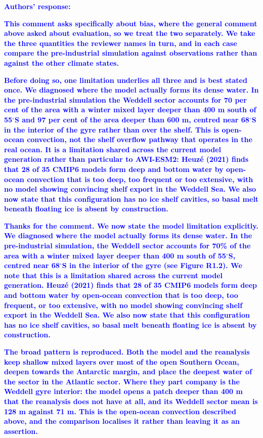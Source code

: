 \documentclass[pdflatex,sn-nature]{sn-jnl}
\begin{document}
\noindent\textcolor{blue}{\textbf{Authors' response:}}


\noindent\textcolor{blue}{\textbf{This comment asks specifically about bias, where the general comment above asked about evaluation, so we treat the two separately. We take the three quantities the reviewer names in turn, and in each case compare the pre-industrial simulation against observations rather than against the other climate states.}}


\noindent\textcolor{blue}{\textbf{Before doing so, one limitation underlies all three and is best stated once. We diagnosed where the model actually forms its dense water. In the pre-industrial simulation the Weddell sector accounts for 70 per cent of the area with a winter mixed layer deeper than 400 m south of 55$^\circ$S and 97 per cent of the area deeper than 600 m, centred near 68$^\circ$S in the interior of the gyre rather than over the shelf. This is open-ocean convection, not the shelf overflow pathway that operates in the real ocean. It is a limitation shared across the current model generation rather than particular to AWI-ESM2: Heuz\'e (2021) finds that 28 of 35 CMIP6 models form deep and bottom water by open-ocean convection that is too deep, too frequent or too extensive, with no model showing convincing shelf export in the Weddell Sea. We also now state that this configuration has no ice shelf cavities, so basal melt beneath floating ice is absent by construction.}}


\noindent\textcolor{blue}{\textbf{Thanks for the comment. We now state the model limitation explicitly. We diagnosed where the model actually forms its dense water. In the pre-industrial simulation, the Weddell sector accounts for 70\% of the area with a winter mixed layer deeper than 400 m south of 55$^\circ$S, centred near 68$^\circ$S in the interior of the gyre (see Figure R1.2). We note that this is a limitation shared across the current model generation. Heuz\'e (2021) finds that 28 of 35 CMIP6 models form deep and bottom water by open-ocean convection that is too deep, too frequent, or too extensive, with no model showing convincing shelf export in the Weddell Sea. We also now state that this configuration has no ice shelf cavities, so basal melt beneath floating ice is absent by construction.}}


\noindent\textcolor{blue}{\textbf{The broad pattern is reproduced. Both the model and the reanalysis keep shallow mixed layers over most of the open Southern Ocean, deepen towards the Antarctic margin, and place the deepest water of the sector in the Atlantic sector. Where they part company is the Weddell gyre interior: the model opens a patch deeper than 400 m that the reanalysis does not have at all, and its Weddell sector mean is 128 m against 71 m. This is the open-ocean convection described above, and the comparison localises it rather than leaving it as an assertion.}}
\end{document}
